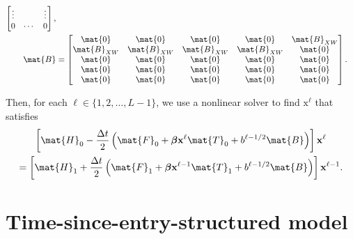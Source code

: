 \documentclass{jpmarticle}
\renewcommand{\vec}[1]{\boldsymbol{\mathrm{#1}}}
\let\subequationsorig\subequations%
\let\endsubequationsorig\endsubequations%
\renewenvironment{subequations}{
  \subequationsorig
  \renewcommand{\theequation}{\theparentequation.\arabic{equation}}
}{
  \endsubequationsorig
}
\begin{document}
\begin{subequations}
\begin{align}
\begin{bmatrix}
      \vdots & & \vdots \\
      0 & \cdots & 0
    \end{bmatrix},
    \\
    \mat{B} &=
    \begin{bmatrix}
      \mat{0} & \mat{0} & \mat{0} & \mat{0} & \mat{B}_{XW}
      \\
      \mat{B}_{XW} & \mat{B}_{XW} & \mat{B}_{XW} & \mat{B}_{XW} & \mat{0}
      \\
      \mat{0} & \mat{0} & \mat{0} & \mat{0} & \mat{0}
      \\
      \mat{0} & \mat{0} & \mat{0} & \mat{0} & \mat{0}
      \\
      \mat{0} & \mat{0} & \mat{0} & \mat{0} & \mat{0}
    \end{bmatrix}.
  \end{align}
\end{subequations}
Then, for each $\ell \in \{1, 2, \ldots, L - 1\}$,
we use a nonlinear solver to find $\vec{x}^{\ell}$ that satisfies
\begin{multline}
  \left[
    \mat{H}_0
    - \frac{\Delta t}{2}
    \left(
      \mat{F}_0
      + \vec{\beta} \vec{x}^{\ell} \mat{T}_0
      + b^{\ell - 1 / 2} \mat{B}
    \right)
  \right] \vec{x}^{\ell}
  \\
  = \left[
    \mat{H}_1
    + \frac{\Delta t}{2}
    \left(
      \mat{F}_1
      + \vec{\beta} \vec{x}^{\ell - 1} \mat{T}_1
      + b^{\ell - 1 / 2} \mat{B}
    \right)
  \right] \vec{x}^{\ell - 1}.
\end{multline}


\section{Time-since-entry-structured model}
\end{document}
